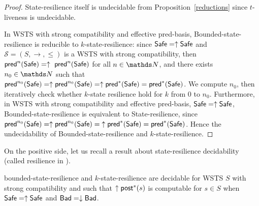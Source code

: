 \begin{proof}
{\sc State-resilience} itself is undecidable from Proposition~\ref{reductions} since $t$-liveness is undecidable.


In WSTS with strong compatibility and effective pred-basis, {\sc Bounded-state-resilience} is
reducible to {\sc $k$-state-resilience}:
% 
since $\Safe=\uparrow \Safe$ and
$\mathscr{S}=(S,\rightarrow,\leq)$ is a WSTS with strong %
compatibility, then $\textsf{pred}^n(\textsf{Safe})= \uparrow~\textsf{pred}^n(\textsf{Safe})$ for all $n \in \N$,
and there exists $n_0 \in \N$ such that 
$\textsf{pred}^{n_0}(\textsf{Safe}) = \uparrow \textsf{pred}^{n_0}(\textsf{Safe}) = \uparrow \textsf{pred}^*(\textsf{Safe}) = \textsf{pred}^*(\textsf{Safe})$.
We compute 
$n_0$, then iteratively check whether $k$-state resilience 
hold for $k$ from $0$ to $n_0$.  
Furthermore, in WSTS with strong compatibility and effective pred-basis,  $\Safe=\uparrow \Safe$, {\sc Bounded-state-resilience} is equivalent to {\sc State-resilience},
%
since 
$\textsf{pred}^{n_0}(\textsf{Safe}) = \uparrow \textsf{pred}^{n_0}(\textsf{Safe}) = {\uparrow \textsf{pred}^*(\textsf{Safe})} = \textsf{pred}^*(\textsf{Safe})$.
Hence the %
 undecidability of {\sc Bounded-state-resilience}
and 
 {\sc $k$-state-resilience}.
%
%
\iffalse
Bounded state-resilience and 
$k$ state-resilience are undecidable for strongly compatible WSTS with effective pred-basis
when
$\Safe=\uparrow \Safe$
and $\Bad=\downarrow \Bad$.
\fi
%
\end{proof}






On the positive side, let us recall a result about state-resilience decidability (called resilience in \cite{DBLP:conf/gg/Ozkan22,DBLP:journals/corr/abs-2108-00889}).

\begin{theorem}\cite{DBLP:conf/gg/Ozkan22,DBLP:journals/corr/abs-2108-00889}\label{ref ozkan}
{\sc bounded-state-resilience} and {\sc $k$-state-resilience} are decidable for WSTS $S$ with strong compatibility and such that $\uparrow \textsf{post}^*(s)$ is computable for $s \in S$
when
$\Safe=\uparrow \Safe$
and $\Bad=\downarrow \Bad$.
\end{theorem}

